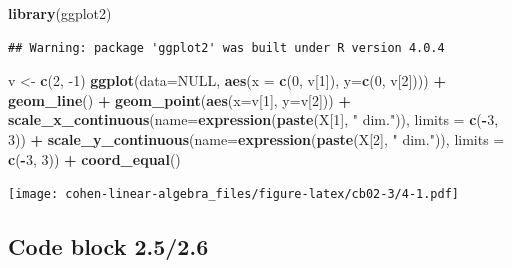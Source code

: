 \documentclass[
]{book}
\newenvironment{Shaded}{\begin{snugshade}}{\end{snugshade}}
\newcommand{\DataTypeTok}[1]{\textcolor[rgb]{0.13,0.29,0.53}{#1}}
\newcommand{\DecValTok}[1]{\textcolor[rgb]{0.00,0.00,0.81}{#1}}
\newcommand{\KeywordTok}[1]{\textcolor[rgb]{0.13,0.29,0.53}{\textbf{#1}}}
\newcommand{\NormalTok}[1]{#1}
\newcommand{\OperatorTok}[1]{\textcolor[rgb]{0.81,0.36,0.00}{\textbf{#1}}}
\newcommand{\OtherTok}[1]{\textcolor[rgb]{0.56,0.35,0.01}{#1}}
\newcommand{\StringTok}[1]{\textcolor[rgb]{0.31,0.60,0.02}{#1}}
\begin{document}
\begin{Shaded}
\begin{Highlighting}[]
\KeywordTok{library}\NormalTok{(ggplot2)}
\end{Highlighting}
\end{Shaded}

\begin{verbatim}
## Warning: package 'ggplot2' was built under R version 4.0.4
\end{verbatim}

\begin{Shaded}
\begin{Highlighting}[]
\NormalTok{v \textless{}{-}}\StringTok{ }\KeywordTok{c}\NormalTok{(}\DecValTok{2}\NormalTok{, }\DecValTok{{-}1}\NormalTok{)}
\KeywordTok{ggplot}\NormalTok{(}\DataTypeTok{data=}\OtherTok{NULL}\NormalTok{, }\KeywordTok{aes}\NormalTok{(}\DataTypeTok{x =} \KeywordTok{c}\NormalTok{(}\DecValTok{0}\NormalTok{, v[}\DecValTok{1}\NormalTok{]), }\DataTypeTok{y=}\KeywordTok{c}\NormalTok{(}\DecValTok{0}\NormalTok{, v[}\DecValTok{2}\NormalTok{])))  }\OperatorTok{+}\StringTok{ }
\StringTok{  }\KeywordTok{geom\_line}\NormalTok{() }\OperatorTok{+}\StringTok{ }
\StringTok{  }\KeywordTok{geom\_point}\NormalTok{(}\KeywordTok{aes}\NormalTok{(}\DataTypeTok{x=}\NormalTok{v[}\DecValTok{1}\NormalTok{], }\DataTypeTok{y=}\NormalTok{v[}\DecValTok{2}\NormalTok{])) }\OperatorTok{+}\StringTok{ }
\StringTok{  }\KeywordTok{scale\_x\_continuous}\NormalTok{(}\DataTypeTok{name=}\KeywordTok{expression}\NormalTok{(}\KeywordTok{paste}\NormalTok{(X[}\DecValTok{1}\NormalTok{], }\StringTok{" dim."}\NormalTok{)), }\DataTypeTok{limits =} \KeywordTok{c}\NormalTok{(}\OperatorTok{{-}}\DecValTok{3}\NormalTok{, }\DecValTok{3}\NormalTok{)) }\OperatorTok{+}\StringTok{ }
\StringTok{  }\KeywordTok{scale\_y\_continuous}\NormalTok{(}\DataTypeTok{name=}\KeywordTok{expression}\NormalTok{(}\KeywordTok{paste}\NormalTok{(X[}\DecValTok{2}\NormalTok{], }\StringTok{" dim."}\NormalTok{)), }\DataTypeTok{limits =} \KeywordTok{c}\NormalTok{(}\OperatorTok{{-}}\DecValTok{3}\NormalTok{, }\DecValTok{3}\NormalTok{)) }\OperatorTok{+}\StringTok{ }
\StringTok{  }\KeywordTok{coord\_equal}\NormalTok{()}
\end{Highlighting}
\end{Shaded}

\texttt{[image: cohen-linear-algebra\_files/figure-latex/cb02-3/4-1.pdf]}

\hypertarget{code-block-2.52.6}{%
\subsection*{Code block 2.5/2.6}\label{code-block-2.52.6}}
\end{document}
